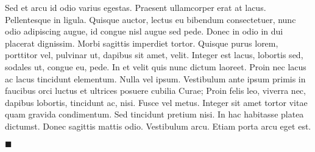 \documentclass{article}
\begin{document}
\begin{handpar}
Sed et arcu id odio varius egestas. Praesent ullamcorper erat at
lacus. Pellentesque in ligula. Quisque auctor, lectus eu bibendum consectetuer,
nunc odio adipiscing augue, id congue nisl augue sed pede. Donec in odio in dui
placerat dignissim. Morbi sagittis imperdiet tortor. Quisque purus lorem,
porttitor vel, pulvinar ut, dapibus sit amet, velit. Integer est lacus, lobortis
sed, sodales ut, congue eu, pede. In et velit quis nunc dictum laoreet. Proin
nec lacus ac lacus tincidunt elementum. Nulla vel ipsum. Vestibulum ante ipsum
primis in faucibus orci luctus et ultrices posuere cubilia Curae; Proin felis
leo, viverra nec, dapibus lobortis, tincidunt ac, nisi. Fusce vel metus. Integer
sit amet tortor vitae quam gravida condimentum. Sed tincidunt pretium nisi. In
hac habitasse platea dictumst. Donec sagittis mattis odio. Vestibulum
arcu. Etiam porta arcu eget est.
\end{handpar}

\vfill

\noindent $\blacksquare$
\end{document}
